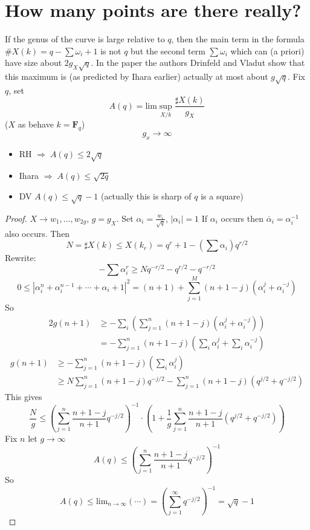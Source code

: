\section{How many points are there really?}
\label{section-really}

\noindent
If the genus of the curve is large relative to $q$, then the main
term in the formula $\#X(k) = q - \sum \omega_i + 1$ is not $q$
but the second term $\sum \omega_i$ which can (a priori) have
size about $2g_X\sqrt{q}$. In the paper \cite{Drinfeld-number}
the authors Drinfeld and Vladut show that this maximum is (as predicted
by Ihara earlier) actually at most about $g\sqrt{q}$. Fix $q$,
set
$$A(q) = \text{lim}\sup_{X/k} \frac{\sharp X(k)}{g_X}$$
($X$ as behave $k=\mathbf{F}_q$)
$$g_x\to \infty$$
\begin{itemize}
\item RH $\Rightarrow\; A(q)\leq 2\sqrt q$
\item Ihara $\Rightarrow\; A(q)\leq \sqrt{2q}$
\item DV $A(q)\leq \sqrt q-1$ (actually this is sharp of $q$ is a
square)
\end{itemize}

\begin{proof} $X\to w_1, \ldots, w_{2g}$, $g=g_{X}$. Set
$\alpha_i=\frac{w_i}{\sqrt q}$, $|\alpha_i|=1$ If $\alpha_i$ occurs then
$\overline{\alpha}_i=\alpha_i^{-1}$ also occurs. Then
$$N=\sharp X(k)\leq X(k_r)=q^r+1-(\sum\alpha_i)q^{r/2}$$
Rewrite:
$$-\sum\alpha_i^r\geq Nq^{-r/2}-q^{r/2}-q^{-r/2}$$
$$0\leq |\alpha_i^n +\alpha_i^{n-1} +\cdots +\alpha_i +1|^2
=(n+1)+\sum_{j=1}^M(n+1-j)(\alpha_i^j+\alpha_i^{-j})$$
So
\begin{align*}
2g(n+1) &\geq -\sum_i \left(\sum_{j=1}^n (n+1-j)(\alpha_i^j
+\alpha_i^{-j})\right)\\
&=-\sum_{j=1}^n (n+1-j)\left(\sum_i\alpha_i^j
+\sum_i\alpha_i^{-j}\right)
\end{align*}
\begin{align*}
g(n+1)&\geq -\sum_{j=1}^n (n+1-j)(\sum_i\alpha_i^j)\\
&\geq N\sum_{j=1}^n (n+1-j)q^{-j/2}-\sum_{j=1}^n
(n+1-j)(q^{j/2}+q^{-j/2})\end{align*}
This gives
$$\frac{N}{g}\leq \left(\sum_{j=1}^n \frac{n+1-j}{n+1}q^{-j/2}
\right)^{-1}\cdot\left(1+\frac{1}{g}\sum_{j=1}^n\frac{n+1-j}{n+1}(q^{j/2}+q^{-j/
2})\right)$$
Fix $n$ let $g\to \infty$
$$A(q)\leq \left(\sum_{j=1}^n \frac{n+1-j}{n+1}q^{-j/2}\right)^{-1}$$
So
$$A(q)\leq \text{lim}_{n\to\infty}(\cdots) = \left(\sum_{j=1}^\infty
q^{-j/2}\right)^{-1}=\sqrt q-1$$
\end{proof}








